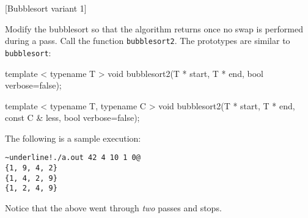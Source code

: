 [Bubblesort variant 1]

Modify the bubblesort so that the algorithm returns once
no swap is performed during a pass.
Call the function \verb!bubblesort2!.
The prototypes are similar to \verb!bubblesort!:
\begin{console}[frame=single, fontsize=\footnotesize]
template < typename T >
void bubblesort2(T * start, T * end, bool verbose=false);

template < typename T, typename C >
void bubblesort2(T * start, T * end, const C & less, bool verbose=false);
\end{console}

The following is a sample execution:
\begin{Verbatim}[frame=single,commandchars=\~\!\@,fontsize=\footnotesize]
~underline!./a.out 42 4 10 1 0@
{1, 9, 4, 2}
{1, 4, 2, 9}
{1, 2, 4, 9}
\end{Verbatim}
Notice that the above went through \textit{two} passes and stops.

